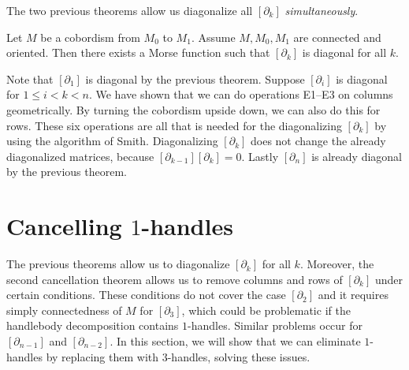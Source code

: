 The two previous theorems allow us diagonalize all $[\partial_k]$ \emph{simultaneously}.
\begin{theorem}
    Let $M$ be a cobordism from  $ M_0$ to $M_{1}$.
    Assume $M, M_0, M_1$ are connected and oriented.
    Then there exists a Morse function such that $[\partial_k]$ is diagonal for all $k$.
\end{theorem}
\begin{myproof}
    Note that $[\partial_1]$ is diagonal by the previous theorem.
    Suppose $[\partial_i]$ is diagonal for  $1 \le  i < k < n$.
    We have shown that we can do operations E1--E3 on columns geometrically.
    By turning the cobordism upside down, we can also do this for rows.
    These six operations are all that is needed for the diagonalizing $[\partial_k]$ by using the algorithm of Smith.
    Diagonalizing $[\partial_k]$ does not change the already diagonalized matrices, because  $[\partial_{k-1}][\partial_k] = 0$.
    Lastly $[\partial_n]$ is already diagonal by the previous theorem.
\end{myproof}



\section{Cancelling $1$-handles}
The previous theorems allow us to diagonalize $[\partial_k]$ for all $k$.
Moreover, the second cancellation theorem allows us to remove columns and rows of $[\partial_k]$ under certain conditions.
These conditions do not cover the case $[\partial_2]$ and it requires simply connectedness of $M$ for  $[\partial_3]$, which could be problematic if the handlebody decomposition contains  $1$-handles.
Similar problems occur for $[\partial_{n-1}]$ and $[\partial_{n-2}]$.
In this section, we will show that we can eliminate $1$-handles by replacing them with $3$-handles, solving these issues.

